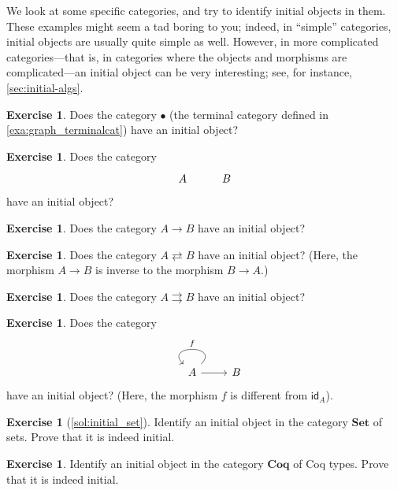 \documentclass[a4paper,11pt, oneside,titlepage=false]{scrbook}
\theoremstyle{plain}
\theoremstyle{definition}
\newtheorem{exer}[thm]{Exercise}
\newcommand{\cfont}[1]{\ensuremath{\mathsf{#1}}}
\newcommand{\Catb}[1]{\mathbf{#1}}
\newcommand{\SET}{\Catb{Set}}
\newcommand{\COQ}{\Catb{Coq}}
\newcommand{\Id}[1][]{\cfont{id}_{#1}}
\begin{document}
We look at some specific categories, and try to identify initial objects in them.
These examples might seem a tad boring to you;
indeed, in ``simple'' categories, initial objects are usually quite simple as well.
However, in more complicated categories---that is, in categories where the objects and morphisms are complicated---an initial object can be very interesting; see, for instance, \cref{sec:initial-algs}.

\begin{exer}
  Does the category $\bullet$ (the terminal category defined in \cref{exa:graph_terminalcat}) have an initial object?
\end{exer}

\begin{exer}
  Does the category
  \[
  \begin{tikzcd}
  	A & B
  \end{tikzcd}
   \]
  have an initial object?
\end{exer}


\begin{exer}
  Does the category $A \to B$ have an initial object?
\end{exer}

\begin{exer}
  Does the category $A \rightleftarrows B$ have an initial object? (Here, the morphism $A \to B$ is inverse to the morphism $B \to A$.)
\end{exer}

\begin{exer}
  Does the category $A \rightrightarrows B$ have an initial object?
\end{exer}

\begin{exer}
  Does the category
  \[
  \begin{tikzcd}
  A \arrow[r] \arrow[loop, swap, looseness=4, "f"] & B
  \end{tikzcd}
  \]
  have an initial object? (Here, the morphism $f$ is different from $\Id[A]$).
\end{exer}

\begin{exer}[\cref{sol:initial_set}]\label{exer:initial_set}
  Identify an initial object in the category $\SET$ of sets.
  Prove that it is indeed initial.
\end{exer}

\begin{exer}
  Identify an initial object in the category $\COQ$ of Coq types.
  Prove that it is indeed initial.
\end{exer}
\end{document}
